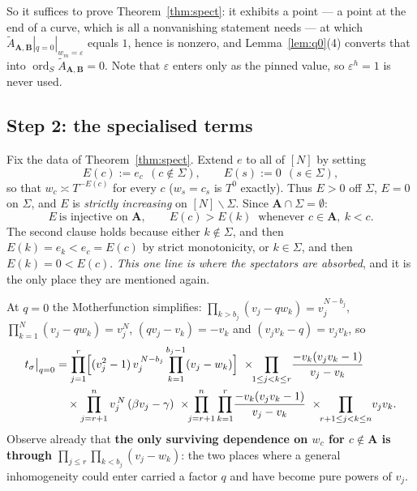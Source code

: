 \documentclass[11pt]{article}
\theoremstyle{plain}
\theoremstyle{definition}
\newcommand{\At}{\widetilde{A}}
\newcommand{\bA}{\mathbf{A}}
\newcommand{\bB}{\mathbf{B}}
\newcommand{\sm}{\smallsetminus}
\newcommand{\ord}{\operatorname{ord}}
\begin{document}
So it suffices to prove Theorem~\ref{thm:spect}: it exhibits a point --- a point
at the end of a curve, which is all a nonvanishing statement needs --- at which
$\At_{\bA,\bB}|_{q=0}|_{w_m=\varepsilon}$ equals $1$, hence is nonzero, and
Lemma~\ref{lem:q0}(4) converts that into $\ord_S\At_{\bA,\bB}=0$.
Note that $\varepsilon$ enters only as the pinned value, so $\varepsilon^{h}=1$
is never used.

\subsection{Step 2: the specialised terms}

Fix the data of Theorem~\ref{thm:spect}.  Extend $e$ to all of $[N]$ by setting
\begin{equation}\label{eq:E}
  E(c):=e_c\ \ (c\notin\Sigma),\qquad E(s):=0\ \ (s\in\Sigma),
\end{equation}
so that $w_c\asymp T^{-E(c)}$ for every $c$ ($w_s=c_s$ is $T^{0}$ exactly).  Thus
$E>0$ off $\Sigma$, $E=0$ on $\Sigma$, and $E$ is \emph{strictly increasing} on
$[N]\sm\Sigma$.  Since $\bA\cap\Sigma=\emptyset$:
\begin{equation}\label{eq:distinct}
  E\ \text{is injective on }\bA,\qquad
  E(c)>E(k)\ \text{ whenever } c\in\bA,\ k<c .
\end{equation}
The second clause holds because either $k\notin\Sigma$, and then $E(k)=e_k<e_c=E(c)$
by strict monotonicity, or $k\in\Sigma$, and then $E(k)=0<E(c)$.  \emph{This one
line is where the spectators are absorbed}, and it is the only place they are
mentioned again.

At $q=0$ the Motherfunction simplifies: $\prod_{k>b_j}(v_j-qw_k)=v_j^{N-b_j}$,
$\prod_{k=1}^{N}(v_j-qw_k)=v_j^{N}$, $(qv_j-v_k)=-v_k$ and
$(v_jv_k-q)=v_jv_k$, so
\begin{align}
  t_\sigma\big|_{q=0}
  &=\prod_{j=1}^{r}\Bigl[(v_j^{2}-1)\,v_j^{\,N-b_j}
        \prod_{k=1}^{b_j-1}(v_j-w_k)\Bigr]
   \ \times\!\!\prod_{1\le j<k\le r}\!\frac{-v_k(v_jv_k-1)}{v_j-v_k}
   \label{eq:t0}\\
  &\quad\times\prod_{j=r+1}^{n}v_j^{\,N}\,(\beta v_j-\gamma)
   \ \times\!\!\prod_{j=r+1}^{n}\prod_{k=1}^{r}\!\frac{-v_k(v_jv_k-1)}{v_j-v_k}
   \ \times\!\!\prod_{r+1\le j<k\le n}\!v_jv_k .\notag
\end{align}
Observe already that \textbf{the only surviving dependence on $w_c$ for
$c\notin\bA$ is through $\prod_{j\le r}\prod_{k<b_j}(v_j-w_k)$}: the two places
where a general inhomogeneity could enter carried a factor $q$ and have become
pure powers of $v_j$.
\end{document}
